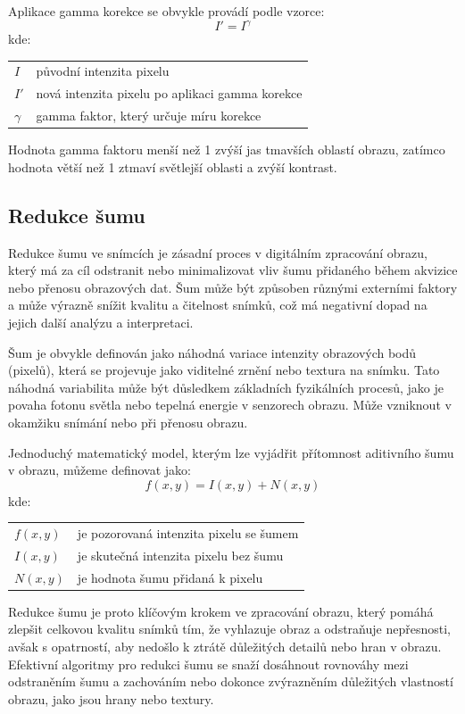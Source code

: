 \documentclass[male,czech,api_ing]{thesis}
\makeatletter
\newenvironment{conditions}[1][kde:]
    {#1 \begin{tabular}[t]{>{$}l<{$} @{${}={}$} >{\raggedright\arraybackslash}p{10cm}}}
    {\end{tabular}}
\makeatother
\begin{document}
Aplikace gamma korekce se obvykle provádí podle vzorce:
\begin{equation}
    I' = I^\gamma
\end{equation}
\begin{conditions}
    I &  původní intenzita pixelu \\
    I' & nová intenzita pixelu po aplikaci gamma korekce \\
    \gamma & gamma faktor, který určuje míru korekce
\end{conditions}

Hodnota gamma faktoru menší než 1 zvýší jas tmavších oblastí obrazu, zatímco hodnota větší než 1 ztmaví světlejší oblasti a zvýší kontrast.
 
\subsection{Redukce šumu}
Redukce šumu ve snímcích je zásadní proces v digitálním zpracování obrazu, který má za cíl odstranit nebo minimalizovat vliv šumu přidaného během akvizice nebo přenosu obrazových dat. Šum může být způsoben různými externími faktory a může výrazně snížit kvalitu a čitelnost snímků, což má negativní dopad na jejich další analýzu a interpretaci.

Šum je obvykle definován jako náhodná variace intenzity obrazových bodů (pixelů), která se projevuje jako viditelné zrnění nebo textura na snímku. Tato náhodná variabilita může být důsledkem základních fyzikálních procesů, jako je povaha fotonu světla nebo tepelná energie v senzorech obrazu. Může vzniknout v okamžiku snímání nebo při přenosu obrazu.

Jednoduchý matematický model, kterým lze vyjádřit přítomnost aditivního šumu v obrazu, můžeme definovat jako:
\begin{equation}
    f(x, y) = I(x, y) + N(x, y)
\end{equation}
\begin{conditions}
    f(x, y) & je pozorovaná intenzita pixelu se šumem \\
    I(x, y) & je skutečná intenzita pixelu bez šumu \\
    N(x, y) & je hodnota šumu přidaná k pixelu
\end{conditions}

Redukce šumu je proto klíčovým krokem ve zpracování obrazu, který pomáhá zlepšit celkovou kvalitu snímků tím, že vyhlazuje obraz a odstraňuje nepřesnosti, avšak s opatrností, aby nedošlo k ztrátě důležitých detailů nebo hran v obrazu. Efektivní algoritmy pro redukci šumu se snaží dosáhnout rovnováhy mezi odstraněním šumu a zachováním nebo dokonce zvýrazněním důležitých vlastností obrazu, jako jsou hrany nebo textury. \cite{ImageDenoisingTechniques,ImageNoiseReductionIran}
\end{document}
